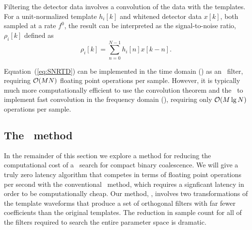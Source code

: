Filtering the detector data involves a convolution of the data with the
templates.  For a unit-normalized template $h_i[k]$ and whitened detector data
$x[k]$, both sampled at a rate $f^0$, the result can be interpreted as the
signal-to-noise ratio, $\rho_i[k]$ defined as
%
%
\begin{equation}
	\label{eq:SNRTD}
	\rho_i [k] = \sum_{n=0}^{N-1} h_{i}[n] x [k-n].
\end{equation}

Equation~(\ref{eq:SNRTD}) can be implemented in the time domain (\TD) as an
\fir\ filter, requiring $\mathcal O(M N)$ floating point
operations per sample.  However, it is typically much more computationally
efficient to use the convolution theorem and the \fft\ to implement fast
convolution in the frequency domain (\FD), requiring only $\mathcal O(M
\lg N)$ operations per sample.


\subsection{The \lloid\ method}

In the remainder of this section we explore a method for reducing the
computational cost of a \TD\ search for compact binary coalescence.  We will
give a truly zero latency algorithm that competes in terms of floating point
operations per second with the conventional \FD\ method, which requires a
signficant latency in order to be computationally cheap. Our method, \lloid{},
involves two transformations of the template waveforms that produce a set of
orthogonal filters with far fewer coefficients than the original templates.
The reduction in sample count for all of the filters required to search the
entire parameter space is dramatic.

